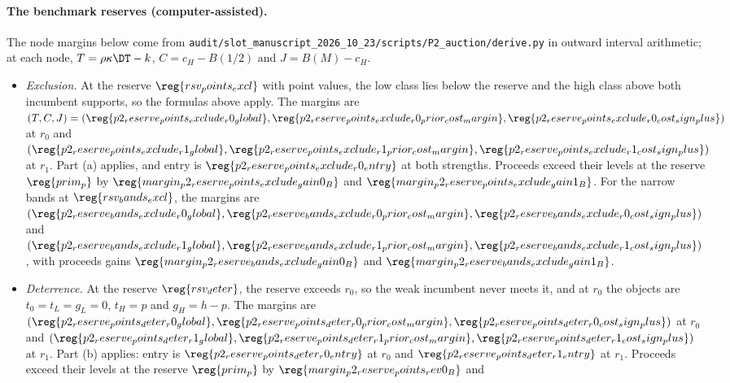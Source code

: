 \paragraph{The benchmark reserves (computer-assisted).}
The node margins below come from \nolinkurl{audit/slot_manuscript_2026_10_23/scripts/P2_auction/derive.py} in outward
interval arithmetic; at each node, \(T=\rho\kappa\DT-k\), \(C=c_H-B(1/2)\) and \(J=B(M)-c_H\).
\begin{itemize}[leftmargin=2em]
\item \emph{Exclusion.} At the reserve \(\reg{rsv_points_excl}\) with point values, the low class lies below the reserve
and the high class above both incumbent supports, so the formulas above apply. The margins are
\((T,C,J)=(\reg{p2_reserve_points_exclude_r0_global},\reg{p2_reserve_points_exclude_r0_prior_cost_margin},
\reg{p2_reserve_points_exclude_r0_cost_sign_plus})\) at \(r_0\) and
\((\reg{p2_reserve_points_exclude_r1_global},\reg{p2_reserve_points_exclude_r1_prior_cost_margin},
\reg{p2_reserve_points_exclude_r1_cost_sign_plus})\) at \(r_1\). Part (a) applies, and entry is
\(\reg{p2_reserve_points_exclude_r0_entry}\) at both strengths. Proceeds exceed their levels at the reserve
\(\reg{prim_p}\) by \(\reg{margin_p2_reserve_points_exclude_gain0_B}\) and \(\reg{margin_p2_reserve_points_exclude_gain1_B}\).
For the narrow bands at \(\reg{rsv_bands_excl}\), the margins are
\((\reg{p2_reserve_bands_exclude_r0_global},\reg{p2_reserve_bands_exclude_r0_prior_cost_margin},
\reg{p2_reserve_bands_exclude_r0_cost_sign_plus})\) and
\((\reg{p2_reserve_bands_exclude_r1_global},\reg{p2_reserve_bands_exclude_r1_prior_cost_margin},
\reg{p2_reserve_bands_exclude_r1_cost_sign_plus})\), with proceeds gains \(\reg{margin_p2_reserve_bands_exclude_gain0_B}\)
and \(\reg{margin_p2_reserve_bands_exclude_gain1_B}\).
\item \emph{Deterrence.} At the reserve \(\reg{rsv_deter}\), the reserve exceeds \(r_0\), so the weak incumbent never
meets it, and at \(r_0\) the objects are \(t_0=t_L=g_L=0\), \(t_H=p\) and \(g_H=h-p\). The margins are
\((\reg{p2_reserve_points_deter_r0_global},\reg{p2_reserve_points_deter_r0_prior_cost_margin},
\reg{p2_reserve_points_deter_r0_cost_sign_plus})\) at \(r_0\) and
\((\reg{p2_reserve_points_deter_r1_global},\reg{p2_reserve_points_deter_r1_prior_cost_margin},
\reg{p2_reserve_points_deter_r1_cost_sign_plus})\) at \(r_1\). Part (b) applies: entry is
\(\reg{p2_reserve_points_deter_r0_entry}\) at \(r_0\) and \(\reg{p2_reserve_points_deter_r1_entry}\) at \(r_1\). Proceeds
exceed their levels at the reserve \(\reg{prim_p}\) by \(\reg{margin_p2_reserve_points_rev0_B}\) and

\end{itemize}
